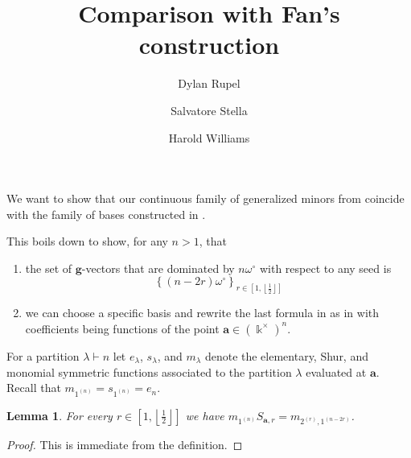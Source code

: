 \documentclass[12pt]{amsart}
\newcommand{\bfa}{\mathbf{a}}
\newcommand{\bfg}{\mathbf{g}}
\newcommand{\kk}{\Bbbk}
\newtheorem{lemma}[theorem]{Lemma}
\theoremstyle{definition}
\numberwithin{equation}{section}
\numberwithin{figure}{section}
\begin{document}
\title{Comparison with Fan's construction}

\author[Dylan Rupel]{Dylan Rupel}
\address[Dylan Rupel]{University of Notre Dame, Department of Mathematics, Notre Dame, IN 46556, USA}

\author[Salvatore Stella]{Salvatore Stella}
\address[Salvatore Stella]{University of Haifa, Department of Mathematics, Haifa, 31905, Israel}

\author[Harold Williams]{Harold Williams}
\address[Harold Williams]{University of California, Davis, Department of Mathematics, Davis, CA 95616, USA}

%
%
%
%
%

We want to show that our continuous family of generalized minors from \cite[Theorem 4.6]{RSW19} coincide with the family of bases constructed in \cite[Theorem 1.2.1]{Qin19}.

This boils down to show, for any $n>1$, that
\begin{enumerate}
  \item 
    the set of $\bfg$-vectors that are dominated by $n\omega^\circ$ with respect to any seed is 
    \[
      \left\{(n-2r)\omega^\circ \right\}_{r\in\left[1,\left\lfloor\frac{1}{2}\right\rfloor\right]}
    \]

  \item
    we can choose a specific basis and rewrite the last formula in \cite[Proposition 4.4]{RSW19} as in \cite[Theorem 1.2.1]{Qin19} with coefficients being functions of the point $\bfa\in(\kk^\times)^n$. 
\end{enumerate}

For a partition $\lambda \vdash n$ let $e_\lambda$, $s_\lambda$, and $m_\lambda$ denote the elementary, Shur, and monomial symmetric functions associated to the partition $\lambda$ evaluated at $\bfa$.
Recall that $m_{1^{(n)}} = s_{1^{(n)}} = e_n$.

\begin{lemma}
  For every $r\in\left[1,\left\lfloor\frac{1}{2}\right\rfloor\right]$ we have $m_{1^{(n)}} S_{\bfa,r} = m_{2^{(r)},1^{(n-2r)}}$.
\end{lemma}
\begin{proof}
  This is immediate from the definition.
\end{proof}
\end{document}

